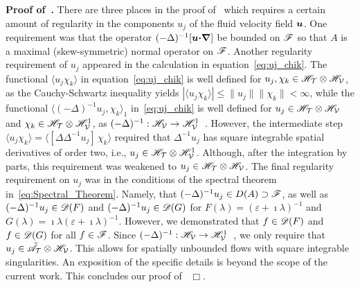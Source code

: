 \documentclass[amsa]{ipart}
\begin{document}
\textbf{Proof of~.}\hspace{1ex}
%
There are three places in the proof of~
which requires a certain amount of regularity in the components $u_j$
of the fluid velocity field $\boldsymbol{u}$. One requirement was that the
operator 
$(-\Delta)^{-1}[\boldsymbol{u}\mbox{\boldmath${\cdot}$}\mbox{\boldmath${\nabla}$}]$ be bounded on $\mathscr{F}$ so that $A$ is a
maximal (skew-symmetric) normal operator on $\mathscr{F}$. Another regularity
requirement of $u_j$ appeared in the calculation in
equation~\eqref{eq:uj_chik}. The functional 
$\langle u_j\chi_k\rangle$ in equation~\eqref{eq:uj_chik} is well defined for
$u_j,\chi_k\in\mathscr{H}_{\mathcal{T}}\otimes\mathscr{H}_{\mathcal{V}}$, as the Cauchy-Schwartz inequality yields
$|\langle u_j\chi_k\rangle|\leq\|u_j\|\|\chi_k\|<\infty$, while the functional
$\langle(-\Delta)^{-1}u_j,\chi_k\rangle_1$ in~\eqref{eq:uj_chik} is well defined for
$u_j\in\mathscr{H}_{\mathcal{T}}\otimes\mathscr{H}_{\mathcal{V}}$ and $\chi_k\in\mathscr{H}_{\mathcal{T}}\otimes\mathscr{H}^1_{\mathcal{V}}$, as
$(-\Delta)^{-1}:\mathscr{H}_{\mathcal{V}}\to\mathscr{H}^1_{\mathcal{V}}$~\cite{Bhattacharya:AAP:1999:951}. However,
the intermediate step 
$\langle u_j\chi_k\rangle=\langle[\Delta\Delta^{-1}u_j]\,\chi_k\rangle$ required that $\Delta^{-1}u_j$ has square
integrable spatial derivatives of order two, i.e.,
$u_j\in\mathscr{H}_{\mathcal{T}}\otimes\mathscr{H}^1_{\mathcal{V}}$. Although, after the integration by parts,
this requirement was weakened to $u_j\in\mathscr{H}_{\mathcal{T}}\otimes\mathscr{H}_{\mathcal{V}}$. The final
regularity requirement on $u_j$ was in the conditions of the spectral
theorem in~\eqref{eq:Spectral_Theorem}. Namely, that
$(-\Delta)^{-1}u_j\in D(A)\supset\mathscr{F}$, as well as $(-\Delta)^{-1}u_j\in\mathscr{D}(F)$
and $(-\Delta)^{-1}u_j\in\mathscr{D}(G)$ for $F(\lambda)=(\varepsilon+\imath\lambda)^{-1}$ and
$G(\lambda)=\imath\lambda(\varepsilon+\imath\lambda)^{-1}$. However, we demonstrated that $f\in\mathscr{D}(F)$ and 
$f\in\mathscr{D}(G)$ for all $f\in\mathscr{F}$. Since
$(-\Delta)^{-1}:\mathscr{H}_{\mathcal{V}}\to\mathscr{H}^1_{\mathcal{V}}$~\cite{Bhattacharya:AAP:1999:951}, 
we only require that $u_j\in\tilde{\mathscr{A}}_{\mathcal{T}}\otimes\mathscr{H}_{\mathcal{V}}$.  This allows for
spatially unbounded flows with square integrable singularities. An
exposition of the specific details is beyond the scope of the current
work. This concludes our proof of~ $\Box$.
\end{document}
